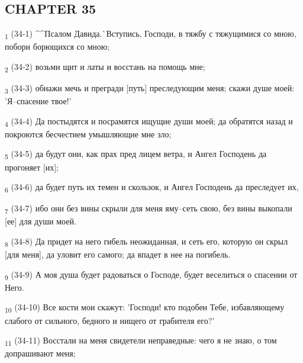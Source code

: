 \subsection{CHAPTER 35}
\begin{tcolorbox}
\textsubscript{1} (34-1) ^^Псалом Давида.^^ Вступись, Господи, в тяжбу с тяжущимися со мною, побори борющихся со мною;
\end{tcolorbox}
\begin{tcolorbox}
\textsubscript{2} (34-2) возьми щит и латы и восстань на помощь мне;
\end{tcolorbox}
\begin{tcolorbox}
\textsubscript{3} (34-3) обнажи мечь и прегради [путь] преследующим меня; скажи душе моей: 'Я--спасение твое!'
\end{tcolorbox}
\begin{tcolorbox}
\textsubscript{4} (34-4) Да постыдятся и посрамятся ищущие души моей; да обратятся назад и покроются бесчестием умышляющие мне зло;
\end{tcolorbox}
\begin{tcolorbox}
\textsubscript{5} (34-5) да будут они, как прах пред лицем ветра, и Ангел Господень да прогоняет [их];
\end{tcolorbox}
\begin{tcolorbox}
\textsubscript{6} (34-6) да будет путь их темен и скользок, и Ангел Господень да преследует их,
\end{tcolorbox}
\begin{tcolorbox}
\textsubscript{7} (34-7) ибо они без вины скрыли для меня яму--сеть свою, без вины выкопали [ее] для души моей.
\end{tcolorbox}
\begin{tcolorbox}
\textsubscript{8} (34-8) Да придет на него гибель неожиданная, и сеть его, которую он скрыл [для меня], да уловит его самого; да впадет в нее на погибель.
\end{tcolorbox}
\begin{tcolorbox}
\textsubscript{9} (34-9) А моя душа будет радоваться о Господе, будет веселиться о спасении от Него.
\end{tcolorbox}
\begin{tcolorbox}
\textsubscript{10} (34-10) Все кости мои скажут: 'Господи! кто подобен Тебе, избавляющему слабого от сильного, бедного и нищего от грабителя его?'
\end{tcolorbox}
\begin{tcolorbox}
\textsubscript{11} (34-11) Восстали на меня свидетели неправедные: чего я не знаю, о том допрашивают меня;
\end{tcolorbox}
